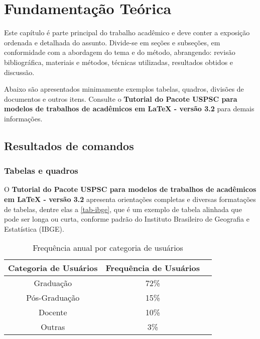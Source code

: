 

\chapter{Fundamentação Teórica}
\label{chap:fundamentacao_teorica}
\vspace{-\baselineskip} %

Este capítulo é parte principal do trabalho acadêmico e deve conter a exposição ordenada e detalhada do assunto. Divide-se em seções e subseções, em conformidade com a abordagem do tema e do método, abrangendo: revisão bibliográfica, materiais e métodos, técnicas utilizadas, resultados obtidos e discussão.

Abaixo são apresentados minimamente exemplos tabelas, quadros, divisões de documentos e outros itens. Consulte o \textbf{Tutorial do Pacote USPSC para modelos de trabalhos de acad\^emicos em LaTeX - vers\~ao 3.2} para demais informações. 

\section{Resultados de comandos}\label{sec-divisoes}

\subsection{Tabelas e quadros}

O \textbf{Tutorial do Pacote USPSC para modelos de trabalhos de acad\^emicos em LaTeX - vers\~ao 3.2} apresenta orientações completas e diversas formatações de tabelas, dentre elas a \autoref{tab-ibge}, que é um exemplo de tabela alinhada que pode ser longa ou curta, conforme padrão do Instituto Brasileiro de Geografia e Estatística (IBGE).




\begin{table}[h] 
		\caption{Frequência anual por categoria de usuários}%
		\label{tab-ibge}
		\begin{tabular}{ccc}
			\toprule
			Categoria de Usuários & Frequência de Usuários \\
			\midrule \midrule
			Graduação & 72\% \\
			\midrule 
			Pós-Graduação & 15\% \\
			\midrule 
			Docente & 10\% \\
			\midrule 
			Outras & 3\% \\
			\bottomrule
		\end{tabular}%
\end{table}

